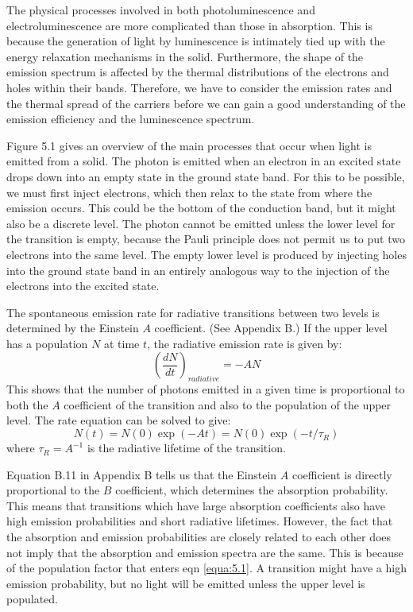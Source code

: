 \documentclass[12pt]{book}
\begin{document}
The physical processes involved in both photoluminescence and electroluminescence are more complicated than those in absorption. This is because the generation of light by luminescence is intimately tied up with the energy relaxation mechanisms in the solid. Furthermore, the shape of the emission spectrum is affected by the thermal distributions of the electrons and holes within their bands. Therefore, we have to consider the emission rates and the thermal spread of the carriers before we can gain a good understanding of the emission efficiency and the luminescence spectrum.

Figure 5.1 gives an overview of the main processes that occur when light is emitted from a solid. The photon is emitted when an electron in an excited state drops down into an empty state in the ground state band. For this to be possible, we must first inject electrons, which then relax to the state from where the emission occurs. This could be the bottom of the conduction band, but it might also be a discrete level. The photon cannot be emitted unless the lower level for the transition is empty, because the Pauli principle does not permit us to put two electrons into the same level. The empty lower level is produced by injecting holes into the ground state band in an entirely analogous way to the injection of the electrons into the excited state.

The spontaneous emission rate for radiative transitions between two levels is determined by the Einstein $A$ coefficient. (See Appendix B.) If the upper level has a population $N$ at time $t$, the radiative emission rate is given by:
\begin{equation}\label{equa:5.1}
  (\frac{dN}{dt})_{radiative}=-AN
\end{equation}
This shows that the number of photons emitted in a given time is proportional to both the $A$ coefficient of the transition and also to the population of the upper level. The rate equation can be solved to give:
\begin{equation}\label{equa:5.2}
  N(t)=N(0)\exp(-At)=N(0)\exp(-t/\tau_R)
\end{equation}
where $\tau_R = A^{-1}$ is the radiative lifetime of the transition.

Equation B.11 in Appendix B tells us that the Einstein $A$ coefficient is directly proportional to the $B$ coefficient, which determines the absorption probability. This means that transitions which have large absorption coefficients also have high emission probabilities and short radiative lifetimes. However, the fact that the absorption and emission probabilities are closely related to each other does not imply that the absorption and emission spectra are the same. This is because of the population factor that enters eqn \ref{equa:5.1}. A transition might have a high emission probability, but no light will be emitted unless the
upper level is populated.
\end{document}
